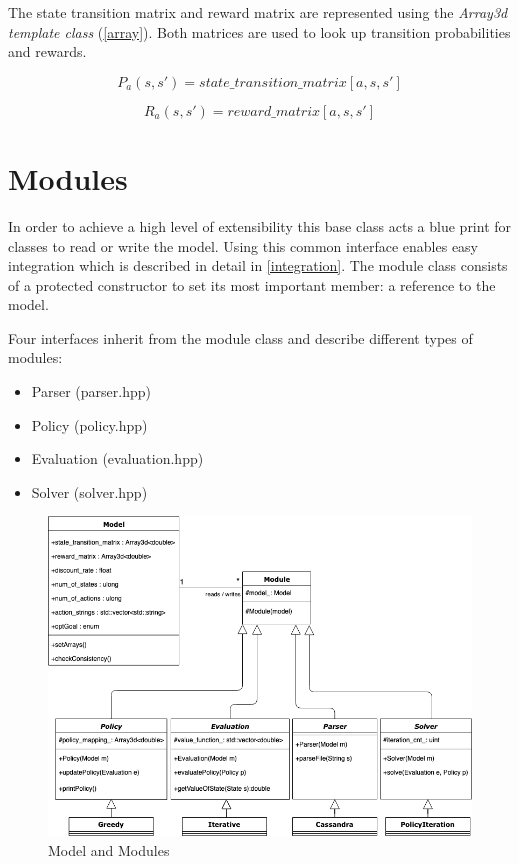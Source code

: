 The state transition matrix and reward matrix are represented using the \emph{Array3d template class} (\autoref{array}).
Both matrices are used to look up transition probabilities and rewards.

\begin{equation}
P_a(s,s') = state\_transition\_matrix[a,s,s']
\end{equation}

\begin{equation}
R_a(s,s') = reward\_matrix[a,s,s']
\end{equation}



\section{Modules}
\label{chaptermodule}

In order to achieve a high level of extensibility this  base class acts a blue print for classes to read or write the model. Using this common interface enables easy integration which is described in detail in \autoref{integration}. The module class consists of a protected constructor to set its most important member: a reference to the model. 

Four interfaces inherit from the module class and describe different types of modules:

\begin{itemize}
	\item Parser (parser.hpp)
	\item Policy (policy.hpp)
	\item Evaluation (evaluation.hpp)
	\item Solver (solver.hpp)
\end{itemize}

\begin{figure}[ht]
	\centering
	\includegraphics[width=.9\textwidth]{images/Modules.png}
	\caption{\label{fig:bild2}Model and Modules}
	\label{Modules}
\end{figure}

